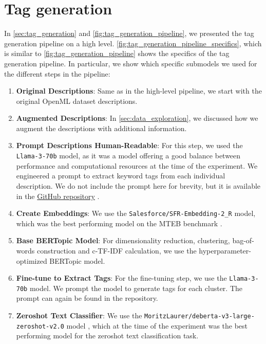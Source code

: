 \section{Tag generation}
In \cref{sec:tag_generation} and \cref{fig:tag_generation_pipeline}, we presented the tag generation pipeline on a high level. \cref{fig:tag_generation_pipeline_specifics}, which is similar to \cref{fig:tag_generation_pipeline} shows the specifics of the tag generation pipeline. In particular, we show which specific submodels we used for the different steps in the pipeline:
\begin{enumerate}
    \item \textbf{Original Descriptions}: Same as in the high-level pipeline, we start with the original OpenML dataset descriptions.
    \item \textbf{Augmented Descriptions}: In \cref{sec:data_exploration}, we discussed how we augment the descriptions with additional information.
    \item \textbf{Prompt Descriptions Human-Readable}: For this step, we used the \texttt{Llama-3-70b} model, as it was a model offering a good balance between performance and computational resources at the time of the experiment. We engineered a prompt to extract keyword tags from each individual description. We do not include the prompt here for brevity, but it is available in the \href{https://github.com/ivangermanov/openml-tags}{GitHub repository} \cite{germanov_topic_modeling_of_2024}.
    \item \textbf{Create Embeddings}: We use the \texttt{Salesforce/SFR-Embedding-2\_R} model, which was the best performing model on the MTEB benchmark \cite{muennighoff_mteb_2023}.
    \item \textbf{Base BERTopic Model}: For dimensionality reduction, clustering, bag-of-words construction and c-TF-IDF calculation, we use the hyperparameter-optimized BERTopic model.
    \item \textbf{Fine-tune to Extract Tags}: For the fine-tuning step, we use the \texttt{Llama-3-70b} model. We prompt the model to generate tags for each cluster. The prompt can again be found in the repository.
    \item \textbf{Zeroshot Text Classifier}: We use the \texttt{MoritzLaurer/deberta-v3-large-zeroshot-v2.0} model \cite{noauthor_moritzlaurerdeberta-v3-large-zeroshot-v20_2024}, which at the time of the experiment was the best performing model for the zeroshot text classification task.
\end{enumerate}

